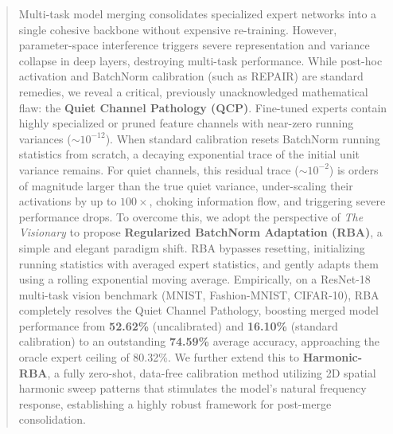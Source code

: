 \documentclass{article}
\begin{document}

\printAffiliationsAndNotice{}

\begin{abstract}
  Multi-task model merging consolidates specialized expert networks into a single cohesive backbone without expensive re-training. However, parameter-space interference triggers severe representation and variance collapse in deep layers, destroying multi-task performance. While post-hoc activation and BatchNorm calibration (such as REPAIR) are standard remedies, we reveal a critical, previously unacknowledged mathematical flaw: the \textbf{Quiet Channel Pathology (QCP)}. Fine-tuned experts contain highly specialized or pruned feature channels with near-zero running variances ($\sim$$10^{-12}$). When standard calibration resets BatchNorm running statistics from scratch, a decaying exponential trace of the initial unit variance remains. For quiet channels, this residual trace ($\sim$$10^{-2}$) is orders of magnitude larger than the true quiet variance, under-scaling their activations by up to $100\times$, choking information flow, and triggering severe performance drops. To overcome this, we adopt the perspective of \textit{The Visionary} to propose \textbf{Regularized BatchNorm Adaptation (RBA)}, a simple and elegant paradigm shift. RBA bypasses resetting, initializing running statistics with averaged expert statistics, and gently adapts them using a rolling exponential moving average. Empirically, on a ResNet-18 multi-task vision benchmark (MNIST, Fashion-MNIST, CIFAR-10), RBA completely resolves the Quiet Channel Pathology, boosting merged model performance from \textbf{52.62\%} (uncalibrated) and \textbf{16.10\%} (standard calibration) to an outstanding \textbf{74.59\%} average accuracy, approaching the oracle expert ceiling of 80.32\%. We further extend this to \textbf{Harmonic-RBA}, a fully zero-shot, data-free calibration method utilizing 2D spatial harmonic sweep patterns that stimulates the model's natural frequency response, establishing a highly robust framework for post-merge consolidation.
\end{abstract}
\end{document}
